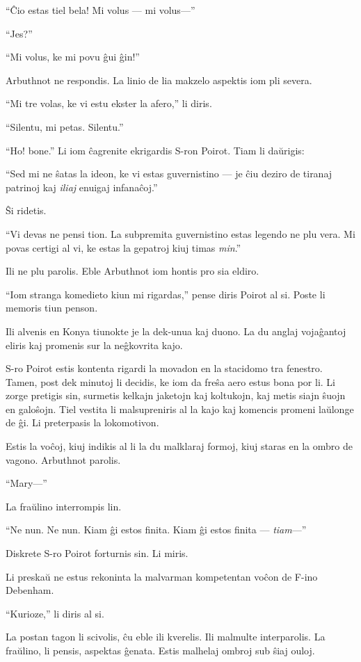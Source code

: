 ``Ĉio estas tiel bela! Mi volus --- mi volus---''

``Jes?''

``Mi volus, ke mi povu ĝui ĝin!''

Arbuthnot ne respondis. La linio de lia makzelo aspektis iom pli severa.

``Mi tre volas, ke vi estu ekster la afero,'' li diris.

``Silentu, mi petas. Silentu.''

\sectionbreak

``Ho! bone.'' Li iom ĉagrenite ekrigardis S-ron Poirot. Tiam li daŭrigis:

``Sed mi ne ŝatas la ideon, ke vi estas guvernistino --- je ĉiu deziro de tiranaj patrinoj kaj \emph{iliaj} enuigaj infanaĉoj.''

Ŝi ridetis.

``Vi devas ne pensi tion. La subpremita guvernistino estas legendo ne plu vera. Mi povas certigi al vi, ke estas la gepatroj kiuj timas \emph{min}.''

Ili ne plu parolis. Eble Arbuthnot iom hontis pro sia eldiro.

``Iom stranga komedieto kiun mi rigardas,'' pense diris Poirot al si. Poste li memoris tiun penson.

Ili alvenis en Konya tiunokte je la dek-unua kaj duono. La du anglaj vojaĝantoj eliris kaj promenis sur la neĝkovrita kajo.

S-ro Poirot estis kontenta rigardi la movadon en la stacidomo tra fenestro. Tamen, post dek minutoj li decidis, ke iom da freŝa aero estus bona por li. Li zorge pretigis sin, surmetis kelkajn jaketojn kaj koltukojn, kaj metis siajn ŝuojn en galoŝojn. Tiel vestita li malsupreniris al la kajo kaj komencis promeni laŭlonge de ĝi. Li preterpasis la lokomotivon.

Estis la voĉoj, kiuj indikis al li la du malklaraj formoj, kiuj staras en la ombro de vagono. Arbuthnot parolis.

``Mary---''

La fraŭlino interrompis lin.

``Ne nun. Ne nun. Kiam ĝi estos finita. Kiam ĝi estos finita --- \emph{tiam}---''

Diskrete S-ro Poirot forturnis sin. Li miris.

Li preskaŭ ne estus rekoninta la malvarman kompetentan voĉon de F-ino Debenham.

``Kurioze,'' li diris al si.

La postan tagon li scivolis, ĉu eble ili kverelis. Ili malmulte interparolis. La fraŭlino, li pensis, aspektas ĝenata. Estis malhelaj ombroj sub ŝiaj ouloj.

